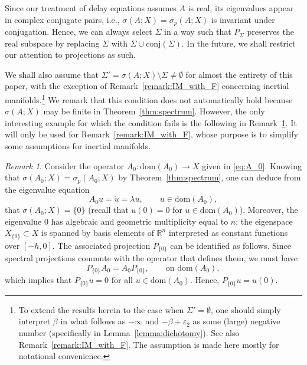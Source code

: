 \documentclass[a4paper, 12pt, oneside, reqno, notitlepage]{amsart}
\theoremstyle{plain}
\theoremstyle{definition}
\theoremstyle{remark}
\newtheorem{remark}[theorem]{Remark}
\newcommand{\dom}{\mathrm{dom}}
\begin{document}
 Since our treatment of delay equations assumes $A$ is real, its eigenvalues appear in complex conjugate pairs, i.e., $\sigma(A;X)= \sigma_p(A;X)$ is invariant under conjugation. 
 Hence, we can always select $\Sigma$ in a way such that $P_\Sigma$ preserves the real subspace by replacing $\Sigma$ with $\Sigma \cup \mathrm{conj}(\Sigma)$.
 In the future, we shall restrict our attention to projections as such.
 
 We shall also assume that $\Sigma' = \sigma(A;X) \setminus \Sigma \neq \emptyset$ for almost the entirety of this paper, with the exception of Remark~\ref{remark:IM_with_F} concerning inertial manifolds.\footnote{To extend the results herein to the case when $\Sigma' = \emptyset$, one should simply interpret $\beta$ in what follows as $-\infty$ and $-\beta+\varepsilon_2$ as some (large) negative number (specifically in Lemma~\ref{lemma:dichotomy}).
 See also Remark~\ref{remark:IM_with_F}.
 The assumption is made here mostly for notational convenience.}
 We remark that this condition does not automatically hold because $\sigma(A;X)$ may be finite in Theorem~\ref{thm:spectrum}.
 However, the only interesting example for which the condition fails is the following in Remark~\ref{remark:A0proj}. 
 It will only be used for Remark~\ref{remark:IM_with_F}, whose purpose is to simplify some assumptions for inertial manifolds.



\begin{remark} \label{remark:A0proj}
    Consider the operator $A_0 : \dom(A_0) \to X$ given in \eqref{eq:A_0}.
    Knowing that $\sigma(A_0;X) = \sigma_p(A_0;X)$ by Theorem~\ref{thm:spectrum}, one can deduce from the eigenvalue equation
    \begin{displaymath}
        A_0 u = \dot{u} = \lambda u, \qquad u \in \dom(A_0),
    \end{displaymath}
    that $\sigma(A_0;X) = \{0\}$ (recall that $\dot{u}(0) = 0$ for $u \in \dom(A_0)$). 
    Moreover, the eigenvalue $0$ has algebraic and geometric multiplicity equal to $n$; the eigenspace $X_{\{0\}} \subset X$ is spanned by basis elements of $\mathbb{R}^n$ interpreted as constant functions over $[-h,0]$. 
    The associated projection $ P_{\{0\}}$ can be identified as follows.
    Since spectral projections commute with the operator that defines them, we must have
    \begin{displaymath}
        P_{\{0\}} A_0 = A_0 P_{\{0\}} , \qquad \text{on } \dom(A_0),
    \end{displaymath}
    which implies that $P_{\{0\}} \dot{u} = 0$ for all $u \in \dom(A_0)$.
    Hence, $P_{\{0\}} u =u(0)$. 
\end{remark}
\end{document}

